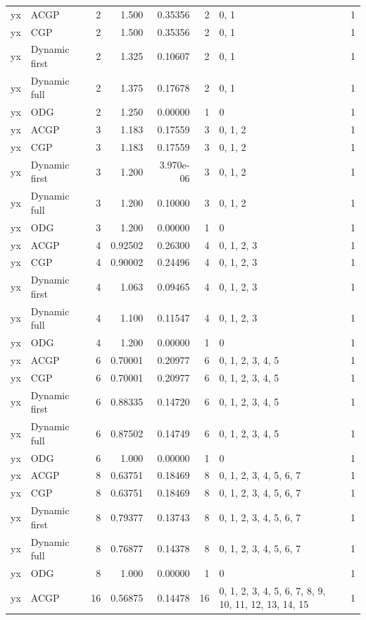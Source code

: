 \documentclass[10pt,a4paper]{article}
\begin{document}
\begin{longtable}{@{}p{23mm}p{29mm}rrrrp{36mm}r@{}}
yx & ACGP & 2 & 1.500 & 0.35356 & 2 & 0, 1 & 1 \\
yx & CGP & 2 & 1.500 & 0.35356 & 2 & 0, 1 & 1 \\
yx & Dynamic first & 2 & 1.325 & 0.10607 & 2 & 0, 1 & 1 \\
yx & Dynamic full & 2 & 1.375 & 0.17678 & 2 & 0, 1 & 1 \\
yx & ODG & 2 & 1.250 & 0.00000 & 1 & 0 & 1 \\
yx & ACGP & 3 & 1.183 & 0.17559 & 3 & 0, 1, 2 & 1 \\
yx & CGP & 3 & 1.183 & 0.17559 & 3 & 0, 1, 2 & 1 \\
yx & Dynamic first & 3 & 1.200 & 3.970e-06 & 3 & 0, 1, 2 & 1 \\
yx & Dynamic full & 3 & 1.200 & 0.10000 & 3 & 0, 1, 2 & 1 \\
yx & ODG & 3 & 1.200 & 0.00000 & 1 & 0 & 1 \\
yx & ACGP & 4 & 0.92502 & 0.26300 & 4 & 0, 1, 2, 3 & 1 \\
yx & CGP & 4 & 0.90002 & 0.24496 & 4 & 0, 1, 2, 3 & 1 \\
yx & Dynamic first & 4 & 1.063 & 0.09465 & 4 & 0, 1, 2, 3 & 1 \\
yx & Dynamic full & 4 & 1.100 & 0.11547 & 4 & 0, 1, 2, 3 & 1 \\
yx & ODG & 4 & 1.200 & 0.00000 & 1 & 0 & 1 \\
yx & ACGP & 6 & 0.70001 & 0.20977 & 6 & 0, 1, 2, 3, 4, 5 & 1 \\
yx & CGP & 6 & 0.70001 & 0.20977 & 6 & 0, 1, 2, 3, 4, 5 & 1 \\
yx & Dynamic first & 6 & 0.88335 & 0.14720 & 6 & 0, 1, 2, 3, 4, 5 & 1 \\
yx & Dynamic full & 6 & 0.87502 & 0.14749 & 6 & 0, 1, 2, 3, 4, 5 & 1 \\
yx & ODG & 6 & 1.000 & 0.00000 & 1 & 0 & 1 \\
yx & ACGP & 8 & 0.63751 & 0.18469 & 8 & 0, 1, 2, 3, 4, 5, 6, 7 & 1 \\
yx & CGP & 8 & 0.63751 & 0.18469 & 8 & 0, 1, 2, 3, 4, 5, 6, 7 & 1 \\
yx & Dynamic first & 8 & 0.79377 & 0.13743 & 8 & 0, 1, 2, 3, 4, 5, 6, 7 & 1 \\
yx & Dynamic full & 8 & 0.76877 & 0.14378 & 8 & 0, 1, 2, 3, 4, 5, 6, 7 & 1 \\
yx & ODG & 8 & 1.000 & 0.00000 & 1 & 0 & 1 \\
yx & ACGP & 16 & 0.56875 & 0.14478 & 16 & 0, 1, 2, 3, 4, 5, 6, 7, 8, 9, 10, 11, 12, 13, 14, 15 & 1 \\

\end{longtable}
\end{document}
